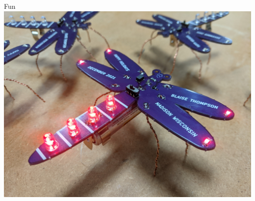 \documentclass{presentation}
\begin{document}
\begin{frame}{Fun}
  \centering
  \includegraphics[width=\textwidth*3/4]{"./fun.jpg"}
\end{frame}
\end{document}
